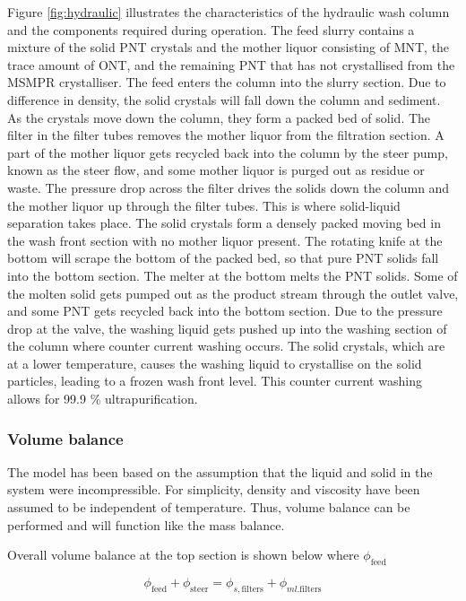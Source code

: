 Figure \ref{fig:hydraulic} illustrates the characteristics of the hydraulic wash column and the components required during operation. The feed slurry contains a mixture of the solid PNT crystals and the mother liquor consisting of MNT, the trace amount of ONT, and the remaining PNT that has not crystallised from the MSMPR crystalliser. The feed enters the column into the slurry section. Due to difference in density, the solid crystals will fall down the column and sediment. As the crystals move down the column, they form a packed bed of solid. The filter in the filter tubes removes the mother liquor from the filtration section. A part of the mother liquor gets recycled back into the column by the steer pump, known as the steer flow, and some mother liquor is purged out as residue or waste. The pressure drop across the filter drives the solids down the column and the mother liquor up through the filter tubes. This is where solid-liquid separation takes place. The solid crystals form a densely packed moving bed in the wash front section with no mother liquor present. The rotating knife at the bottom will scrape the bottom of the packed bed, so that pure PNT solids fall into the bottom section. The melter at the bottom melts the PNT solids. Some of the molten solid gets pumped out as the product stream through the outlet valve, and some PNT gets recycled back into the bottom section. Due to the pressure drop at the valve, the washing liquid gets pushed up into the washing section of the column where counter current washing occurs. The solid crystals, which are at a lower temperature, causes the washing liquid to crystallise on the solid particles, leading to a frozen wash front level. This counter current washing allows for 99.9 \% ultrapurification. 

\subsubsection{Volume balance} 
The model has been based on the assumption that the liquid and solid in the system were incompressible. For simplicity, density and viscosity have been assumed to be independent of temperature. Thus, volume balance can be performed and will function like the mass balance. 

Overall volume balance at the top section is shown below where $\phi_{\mathrm{feed}}$

\begin{equation}
\phi_{\mathrm{feed}}+\phi_{\mathrm{steer}}=\phi_{s,\mathrm{filters}}+\phi_{ml.\mathrm{filters}}
\end{equation}

